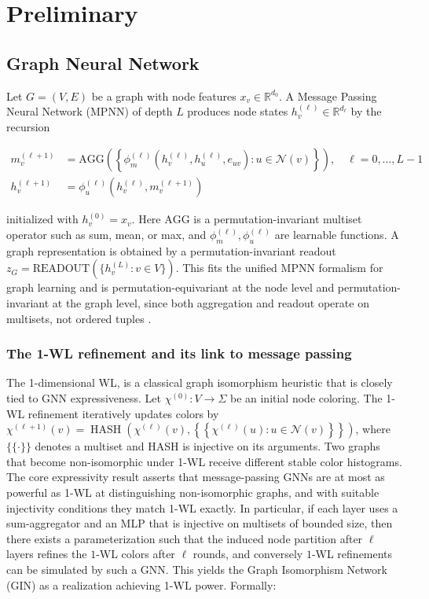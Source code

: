 \documentclass[11pt]{article}
\begin{document}
\section{Preliminary}

\subsection{Graph Neural Network}

Let $G=(V, E)$ be a graph with node features $x_v \in \mathbb{R}^{d_0}$. A Message Passing Neural Network (MPNN) of depth $L$ produces node states $h_v^{(\ell)} \in \mathbb{R}^{d_{\ell}}$ by the recursion

$$
\begin{aligned}
m_v^{(\ell+1)} &= \text{AGG}\left(\left\{\phi_m^{(\ell)}\left(h_v^{(\ell)}, h_u^{(\ell)}, e_{u v}\right): u \in \mathcal{N}(v)\right\}\right), \quad \ell=0, \ldots, L-1 \\
h_v^{(\ell+1)} &= \phi_u^{(\ell)}\left(h_v^{(\ell)}, m_v^{(\ell+1)}\right)
\end{aligned}
$$

initialized with $h_v^{(0)}=x_v$. Here $\text{AGG}$ is a permutation-invariant multiset operator such as sum, mean, or max, and $\phi_m^{(\ell)}, \phi_u^{(\ell)}$ are learnable functions. A graph representation is obtained by a permutation-invariant readout $z_G=\text{READOUT}(\{h_v^{(L)}: v \in V\})$. This fits the unified MPNN formalism for graph learning and is permutation-equivariant at the node level and permutation-invariant at the graph level, since both aggregation and readout operate on multisets, not ordered tuples \citep{xu2019howpowerful}.

\subsubsection{The 1-WL refinement and its link to message passing}

The 1-dimensional WL, is a classical graph isomorphism heuristic that is closely tied to GNN expressiveness. Let $\chi^{(0)}: V \rightarrow \Sigma$ be an initial node coloring. The 1-WL refinement iteratively updates colors by $\chi^{(\ell+1)}(v)=\operatorname{HASH}\left(\chi^{(\ell)}(v),\left\{\left\{\chi^{(\ell)}(u): u \in \mathcal{N}(v)\right\}\right\}\right)$, where $\{\{\cdot\}\}$ denotes a multiset and HASH is injective on its arguments. Two graphs that become non-isomorphic under 1-WL receive different stable color histograms. The core expressivity result asserts that message-passing GNNs are at most as powerful as 1-WL at distinguishing non-isomorphic graphs, and with suitable injectivity conditions they match 1-WL exactly. In particular, if each layer uses a sum-aggregator and an MLP that is injective on multisets of bounded size, then there exists a parameterization such that the induced node partition after $\ell$ layers refines the $1$-WL colors after $\ell$ rounds, and conversely $1$-WL refinements can be simulated by such a GNN. This yields the Graph Isomorphism Network (GIN) as a realization achieving 1-WL power. Formally:
\end{document}
